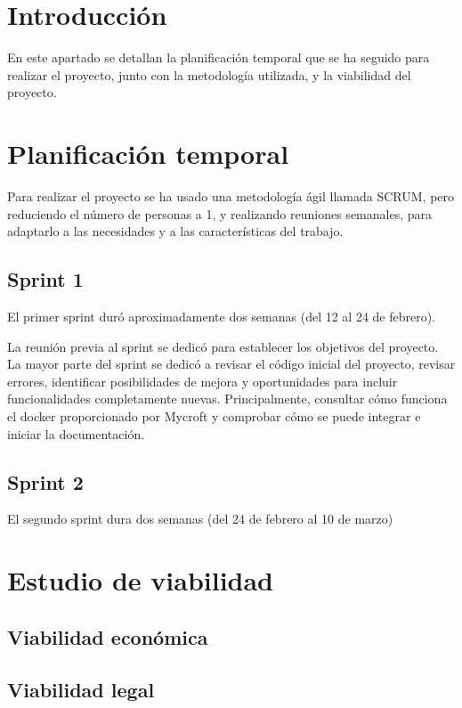 
\section{Introducción}
En este apartado se detallan la planificación temporal que se ha seguido para realizar el proyecto, junto con la metodología utilizada, y la viabilidad del proyecto.

\section{Planificación temporal}
Para realizar el proyecto se ha usado una metodología ágil llamada SCRUM, pero reduciendo el número de personas a 1, y realizando reuniones semanales, para adaptarlo a las necesidades y a las características del trabajo.

\subsection*{Sprint 1}
El primer sprint duró aproximadamente dos semanas (del 12 al 24 de febrero).

La reunión previa al sprint se dedicó para establecer los objetivos del proyecto.
La mayor parte del sprint se dedicó a revisar el código inicial del proyecto, revisar errores, identificar posibilidades de mejora y oportunidades para incluir funcionalidades completamente nuevas. Principalmente, consultar cómo funciona el docker proporcionado por Mycroft y comprobar cómo se puede integrar e iniciar la documentación.

\subsection*{Sprint 2}
El segundo sprint dura dos semanas (del 24 de febrero al 10 de marzo)


\section{Estudio de viabilidad}

\subsection{Viabilidad económica}

\subsection{Viabilidad legal}